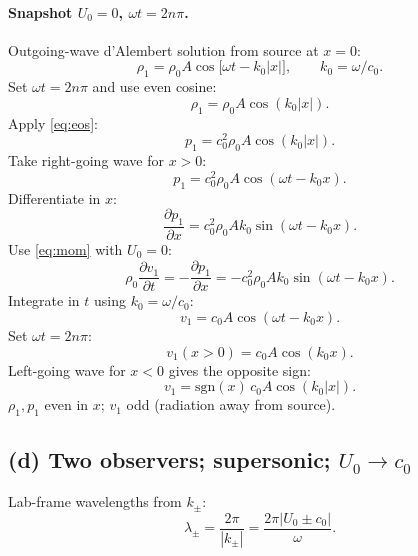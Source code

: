 \documentclass[11pt]{article}
\newcommand{\pd}[2]{\frac{\partial #1}{\partial #2}}
\begin{document}
\paragraph{Snapshot $U_0=0$, $\omega t=2n\pi$.} Outgoing-wave d'Alembert solution from source at $x=0$:
\[ \rho_1 = \rho_0 A\cos\!\bigl[\omega t - k_0|x|\bigr],\qquad k_0=\omega/c_0. \]
Set $\omega t=2n\pi$ and use even cosine:
\[ \rho_1 = \rho_0 A\cos(k_0|x|). \]
Apply \eqref{eq:eos}:
\[ p_1 = c_0^{2}\rho_0 A\cos(k_0|x|). \]
Take right-going wave for $x>0$:
\[ p_1 = c_0^{2}\rho_0 A\cos(\omega t - k_0 x). \]
Differentiate in $x$:
\[ \pd{p_1}{x} = c_0^{2}\rho_0 A k_0\sin(\omega t - k_0 x). \]
Use \eqref{eq:mom} with $U_0=0$:
\[ \rho_0\pd{v_1}{t} = -\pd{p_1}{x} = -c_0^{2}\rho_0 A k_0\sin(\omega t - k_0 x). \]
Integrate in $t$ using $k_0=\omega/c_0$:
\[ v_1 = c_0 A\cos(\omega t - k_0 x). \]
Set $\omega t=2n\pi$:
\[ v_1(x>0) = c_0 A\cos(k_0 x). \]
Left-going wave for $x<0$ gives the opposite sign:
\[ v_1 = \mathrm{sgn}(x)\,c_0 A\cos(k_0|x|). \]
$\rho_1, p_1$ even in $x$; $v_1$ odd (radiation away from source).

\begin{center}
\end{center}

\subsection*{(d) Two observers; supersonic; $U_0\to c_0$}

Lab-frame wavelengths from $k_\pm$:
\[ \lambda_\pm = \frac{2\pi}{|k_\pm|} = \frac{2\pi|U_0\pm c_0|}{\omega}. \]
\end{document}

